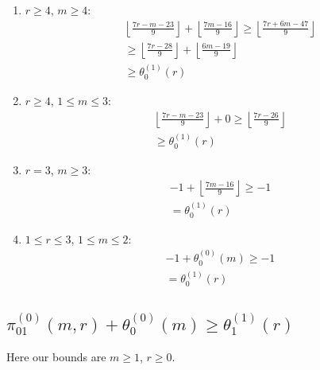 \documentclass[reqno]{amsart}
\theoremstyle{definition}
\theoremstyle{remark}
\numberwithin{equation}{section}
\begin{document}
\begin{enumerate}
\item $r\ge 4$, $m\ge 4$:
\begin{align*}
&\left\lfloor \frac{7r-m-23}{9} \right\rfloor + \left\lfloor \frac{7m-16}{9} \right\rfloor\ge \left\lfloor \frac{7r+6m-47}{9} \right\rfloor\\
&\ge \left\lfloor \frac{7r-28}{9} \right\rfloor + \left\lfloor \frac{6m-19}{9} \right\rfloor\\
&\ge \theta^{(1)}_0(r)
\end{align*}
\item $r\ge 4$, $1\le m\le 3$:
\begin{align*}
&\left\lfloor \frac{7r-m-23}{9} \right\rfloor + 0\ge\left\lfloor \frac{7r-26}{9} \right\rfloor\\
&\ge \theta^{(1)}_0(r)
\end{align*}
\item $r=3$, $m\ge 3$:
\begin{align*}
&-1 + \left\lfloor \frac{7m-16}{9} \right\rfloor\ge -1\\
&=\theta^{(1)}_0(r)
\end{align*}
\item $1\le r\le 3$, $1\le m\le 2$:
\begin{align*}
&-1 + \theta^{(0)}_0(m)\ge -1\\
&= \theta^{(1)}_0(r)
\end{align*}
\end{enumerate}

\subsection{$\displaystyle{\pi^{(0)}_{01}(m,r)+\theta^{(0)}_0(m)\ge\theta^{(1)}_1(r)}$}

Here our bounds are $m\ge 1$, $r\ge 0$.\\
\end{document}
